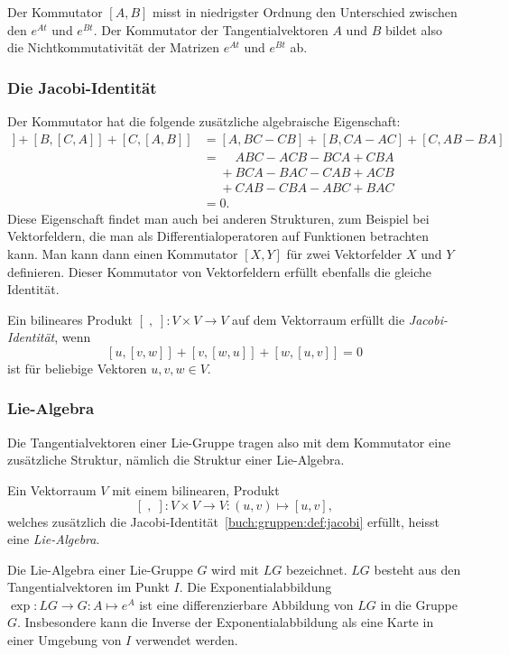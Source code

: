 Der Kommutator $[A,B]$ misst in niedrigster Ordnung den Unterschied
zwischen den $e^{At}$ und $e^{Bt}$.
Der Kommutator der Tangentialvektoren $A$ und $B$ bildet also die
Nichtkommutativität der Matrizen $e^{At}$ und $e^{Bt}$ ab.


\subsubsection{Die Jacobi-Identität}
Der Kommutator hat die folgende zusätzliche algebraische Eigenschaft:
\begin{align*}
[A,[B,C]]
+
[B,[C,A]]
+
[C,[A,B]]
&=
[A,BC-CB]
+
[B,CA-AC]
+
[C,AB-BA]
\\
&=\phantom{+}
ABC-ACB-BCA+CBA
\\
&\phantom{=}+
BCA-BAC-CAB+ACB
\\
&\phantom{=}+
CAB-CBA-ABC+BAC
\\
&=0.
\end{align*}
Diese Eigenschaft findet man auch bei anderen Strukturen, zum Beispiel
bei Vektorfeldern, die man als Differentialoperatoren auf Funktionen 
betrachten kann.
Man kann dann einen Kommutator $[X,Y]$ für zwei Vektorfelder
$X$ und $Y$ definieren.
Dieser Kommutator von Vektorfeldern erfüllt ebenfalls die gleiche
Identität.

\begin{definition}
\label{buch:gruppen:def:jacobi}
Ein bilineares Produkt $[\;,\;]\colon V\times V\to V$ auf dem Vektorraum
erfüllt die {\em Jacobi-Identität}, wenn 
\[
[u,[v,w]] + [v,[w,u]] + [w,[u,v]]=0
\]
ist für beliebige Vektoren $u,v,w\in V$.
\end{definition}

\subsubsection{Lie-Algebra}
Die Tangentialvektoren einer Lie-Gruppe tragen also mit dem Kommutator
eine zusätzliche Struktur, nämlich die Struktur einer Lie-Algebra.

\begin{definition}
Ein Vektorraum $V$ mit einem bilinearen, Produkt
\[
[\;,\;]\colon V\times V \to V : (u,v) \mapsto [u,v],
\]
welches zusätzlich die Jacobi-Identität~\ref{buch:gruppen:def:jacobi}
erfüllt, heisst eine {\em Lie-Algebra}.
\end{definition}

Die Lie-Algebra einer Lie-Gruppe $G$ wird mit $LG$ bezeichnet.
$LG$ besteht aus den Tangentialvektoren im Punkt $I$.
Die Exponentialabbildung $\exp\colon LG\to G:A\mapsto e^A$
ist eine differenzierbare Abbildung von $LG$ in die Gruppe $G$.
Insbesondere kann die Inverse der Exponentialabbildung als eine
Karte in einer Umgebung von $I$ verwendet werden.

